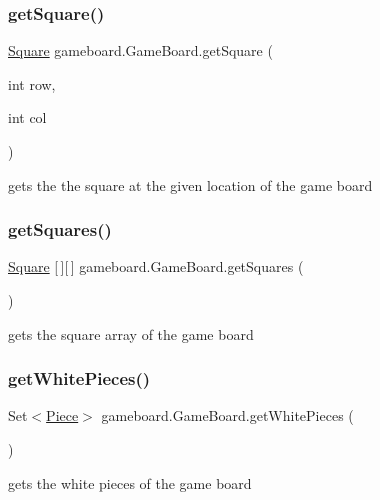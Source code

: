\subsubsection{\texorpdfstring{get\+Square()}{getSquare()}}
{\footnotesize\ttfamily \mbox{\hyperlink{classgameboard_1_1_square}{Square}} gameboard.\+Game\+Board.\+get\+Square (\begin{DoxyParamCaption}\item[{int}]{row,  }\item[{int}]{col }\end{DoxyParamCaption})}

gets the the square at the given location of the game board \mbox{\label{classgameboard_1_1_game_board_a862261920d74b60acd609bfc7d1b1bc2}} 
\subsubsection{\texorpdfstring{get\+Squares()}{getSquares()}}
{\footnotesize\ttfamily \mbox{\hyperlink{classgameboard_1_1_square}{Square}} \mbox{[}$\,$\mbox{]}\mbox{[}$\,$\mbox{]} gameboard.\+Game\+Board.\+get\+Squares (\begin{DoxyParamCaption}{ }\end{DoxyParamCaption})}

gets the square array of the game board \mbox{\label{classgameboard_1_1_game_board_a5c9d9bdb8c155fbc01c72760b33dba1e}} 
\subsubsection{\texorpdfstring{get\+White\+Pieces()}{getWhitePieces()}}
{\footnotesize\ttfamily Set$<$\mbox{\hyperlink{classpieces_1_1_piece}{Piece}}$>$ gameboard.\+Game\+Board.\+get\+White\+Pieces (\begin{DoxyParamCaption}{ }\end{DoxyParamCaption})}

gets the white pieces of the game board \mbox{\label{classgameboard_1_1_game_board_ad7fb7cf5cb3b97770bfaf5c595c5630b}} 
